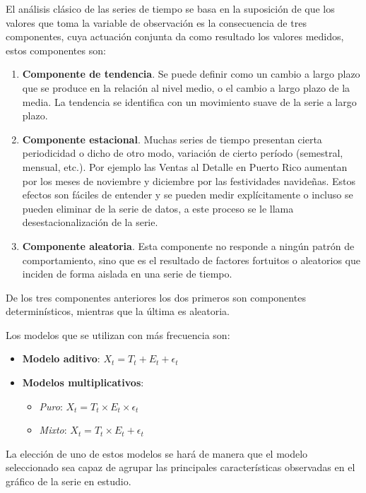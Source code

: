 \documentclass[12pt,]{krantz}
\theoremstyle{definition}
\theoremstyle{definition}
\theoremstyle{definition}
\theoremstyle{remark}
\begin{document}
El análisis clásico de las series de tiempo se basa en la suposición de
que los valores que toma la variable de observación es la consecuencia
de tres componentes, cuya actuación conjunta da como resultado los
valores medidos, estos componentes son:

\begin{enumerate}
\def\labelenumi{\arabic{enumi})}
\item
  \textbf{Componente de tendencia}. Se puede definir como un cambio a
  largo plazo que se produce en la relación al nivel medio, o el cambio
  a largo plazo de la media. La tendencia se identifica con un
  movimiento suave de la serie a largo plazo.
\item
  \textbf{Componente estacional}. Muchas series de tiempo presentan
  cierta periodicidad o dicho de otro modo, variación de cierto período
  (semestral, mensual, etc.). Por ejemplo las Ventas al Detalle en
  Puerto Rico aumentan por los meses de noviembre y diciembre por las
  festividades navideñas. Estos efectos son fáciles de entender y se
  pueden medir explícitamente o incluso se pueden eliminar de la serie
  de datos, a este proceso se le llama desestacionalización de la serie.
\item
  \textbf{Componente aleatoria}. Esta componente no responde a ningún
  patrón de comportamiento, sino que es el resultado de factores
  fortuitos o aleatorios que inciden de forma aislada en una serie de
  tiempo.
\end{enumerate}

De los tres componentes anteriores los dos primeros son componentes
determinísticos, mientras que la última es aleatoria.

Los modelos que se utilizan con más frecuencia son:

\begin{itemize}
\item
  \textbf{Modelo aditivo}: \(X_t=T_t+E_t+\epsilon_t\)
\item
  \textbf{Modelos multiplicativos}:

  \begin{itemize}
  \item
    \emph{Puro}: \(X_t = T_t\times E_t\times\epsilon_t\)
  \item
    \emph{Mixto}: \(X_t = T_t\times E_t+\epsilon_t\)
  \end{itemize}
\end{itemize}

La elección de uno de estos modelos se hará de manera que el modelo
seleccionado sea capaz de agrupar las principales características
observadas en el gráfico de la serie en estudio.
\end{document}
